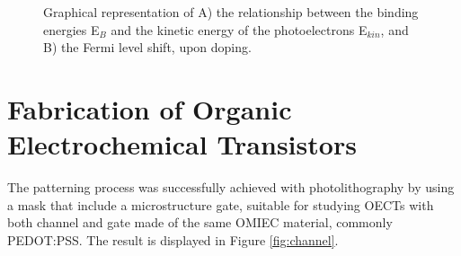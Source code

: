 \begin{figure}[ht]
	\centering
	\hspace{2em}
	\caption[Representation of the Fermi level shift upon doping]{ Graphical representation of A) the relationship between the binding energies E$_{B}$ and the kinetic energy of the photoelectrons E$_{kin}$, and B) the Fermi level shift, upon doping.} 
	\label{fig:ups}
\end{figure}


\section{Fabrication of Organic Electrochemical Transistors}
The patterning process was successfully achieved with photolithography by using a mask that include a microstructure gate, suitable for studying OECTs with both channel and gate made of the same OMIEC material, commonly PEDOT:PSS. The result is displayed in Figure \ref{fig:channel}. 

